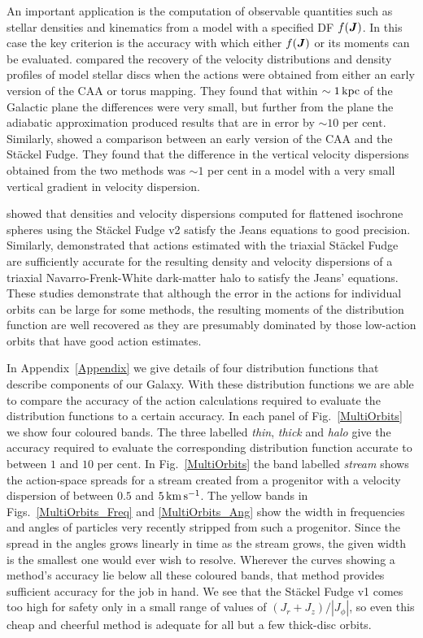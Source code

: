 \documentclass[useAMS,usenatbib,fleqn,a4paper]{mn2e}
\def\kpc{\,{\rm kpc}}
\def\kms{\,{\rm km\,s^{-1}}}
\def\percent{\text{ per cent}}
\newcommand{\bs}[1]{\bmath{#1}}
\def\percent{\text{ per cent}}
\newcommand{\vJ}{\bs{J}}\newcommand{\vx}{\bs{x}}
\begin{document}
An important application is the computation of observable quantities such as
stellar densities and kinematics from a model with a specified DF $f(\vJ)$.
In this case the key criterion is the accuracy with which either $f(\vJ)$ or
its moments can be evaluated.  \cite{BinneyMcMillan2011} compared the
recovery of the velocity distributions and density profiles of model stellar
discs when the actions were obtained from either an early version of the CAA
or torus mapping. They found that within $\sim1\kpc$ of the Galactic plane
the differences were very small, but further from the plane the adiabatic
approximation produced results that are in error by $\sim10\percent$.
Similarly, \cite{BovyRix2013} showed a comparison between an early version of
the CAA and the St\"ackel Fudge. They found that the difference in the
vertical velocity dispersions obtained from the two methods was $\sim1$ per
cent in a model with a very small vertical gradient in velocity dispersion.

\cite{Binney2014_ISO} showed that densities and velocity dispersions computed for
flattened isochrone spheres using the St\"ackel Fudge v2 satisfy the Jeans
equations to good precision. Similarly,
\cite{SandersBinney2014} demonstrated that actions estimated with the
triaxial St\"ackel Fudge are sufficiently accurate for the resulting density
and velocity dispersions of a triaxial Navarro-Frenk-White dark-matter halo
to satisfy the Jeans' equations. These studies demonstrate that although the
error in the actions for individual orbits can be large for some methods, the
resulting moments of the distribution function are well recovered as they are
presumably dominated by those low-action orbits that have good action
estimates.

In Appendix~\ref{Appendix} we give details of four distribution functions
that describe components of our Galaxy. With these distribution functions we
are able to compare the accuracy of the action calculations required to
evaluate the distribution functions to a certain accuracy. In each panel of
Fig.~\ref{MultiOrbits} we show four coloured bands. The three labelled
\emph{thin}, \emph{thick} and \emph{halo} give the accuracy required to
evaluate the corresponding distribution function accurate to between $1$ and
$10\percent$.  In Fig.~\ref{MultiOrbits} the band labelled \emph{stream} shows the
action-space spreads for a stream created from a progenitor with a velocity
dispersion of between $0.5$ and $5\kms$.  The yellow bands in
Figs.~\ref{MultiOrbits_Freq} and \ref{MultiOrbits_Ang} show the width in
frequencies and angles of particles very recently stripped from such a
progenitor. Since the spread in the angles grows linearly in time as the
stream grows, the given width is the smallest one would ever wish to resolve.
Wherever the curves showing a method's accuracy lie below all these coloured
bands, that method provides sufficient accuracy for the job in hand. We see
that the St\"ackel Fudge v1 comes too high for safety only in a small range
of values of $(J_r+J_z)/|J_\phi|$, so even this cheap and cheerful method is
adequate for all but a few thick-disc orbits.
\end{document}
